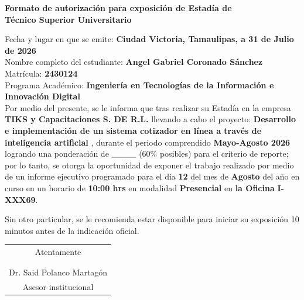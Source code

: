 \documentclass[12pt]{article}
\newcommand{\NombreAlumno}{Angel Gabriel Coronado Sánchez}
\newcommand{\NombreProyecto}{Desarrollo e implementación de un sistema cotizador en línea a través de inteligencia artificial }
\newcommand{\UnidadEconomica}{TIKS y Capacitaciones S. DE R.L.}
\newcommand{\nasesorinstitucional}{Dr. Said Polanco Martagón}
\newcommand{\Matricula}           {2430124}  %
\newcommand{\ncuatrimestre}{Mayo-Agosto 2026}
\newcommand{\fechaAutorizacionInforme}               {31 de Julio de 2026}
\newcommand{\DiaEvaluacionPesentacion}{12}
\newcommand{\MesEvaluacionPesentacion}{Agosto}
\newcommand{\HoraEvaluacionPesentacion}{10:00 hrs}
\newcommand{\modalidadEvaluacionPesentacion}{Presencial} %
\newcommand{\tipoAulaOficinaEnlacePesentacion}{la Oficina} %
\newcommand{\AulaEvaluacionOEnlaceMeetPesentacion}{I-XXX69} %
\newcommand{\ncarrera}            {Ingeniería en Tecnologías de la Información e Innovación Digital}
\begin{document}
\begin{center}
{\Large \textbf{Formato de autorización para exposición de Estadía de}}\\[0.125cm]
{\Large \textbf{Técnico Superior Universitario}}\\[0.25cm]
\end{center}

\noindent
Fecha y lugar en que se emite: \textbf{Ciudad Victoria, Tamaulipas, a \fechaAutorizacionInforme } \\[0.125cm]
Nombre completo del estudiante: \textbf{\NombreAlumno} \\[0.125cm]
Matrícula: \textbf{\Matricula}  \\[0.125cm]
Programa Académico: \textbf{\ncarrera}  \\[0.25cm]

\noindent
Por medio del presente, se le informa que tras realizar su Estadía en la empresa \textbf{\UnidadEconomica} llevando a cabo el proyecto: \textbf{\NombreProyecto}, durante el periodo comprendido \textbf{\ncuatrimestre} logrando una ponderación de \_\_\_\_  (60\% posibles) para el criterio de reporte; por lo tanto, se otorga la oportunidad de exponer el trabajo realizado por medio de un informe ejecutivo programado para el día \textbf{\DiaEvaluacionPesentacion} del mes de \textbf{\MesEvaluacionPesentacion} del año en curso en un horario de \textbf{\HoraEvaluacionPesentacion} en modalidad \textbf{\modalidadEvaluacionPesentacion} en \textbf{\tipoAulaOficinaEnlacePesentacion} \textbf{\AulaEvaluacionOEnlaceMeetPesentacion}.

\vspace{0.25cm}

\noindent
Sin otro particular, se le recomienda estar disponible para iniciar su exposición 10 minutos antes de la indicación oficial.

\vspace{0.5cm}

\begin{center}
\begin{tabular}{p{10cm}}
\multicolumn{1}{c}{Atentamente}   \\
 \\
 \\ \hline
\multicolumn{1}{c}{\nasesorinstitucional}   \\
\multicolumn{1}{c}{Asesor institucional}   \\
\end{tabular}
\end{center}
\end{document}
